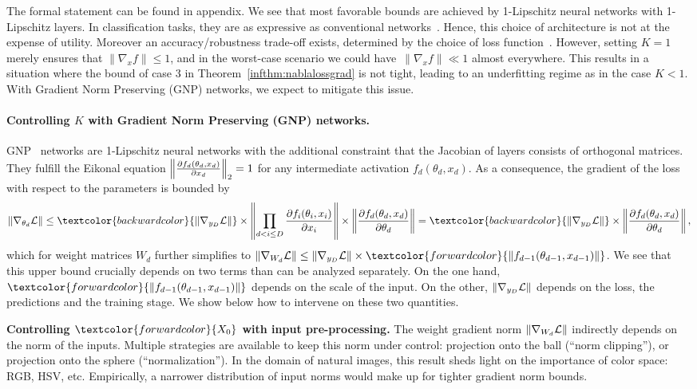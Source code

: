     The formal statement can be found in appendix. We see that most favorable bounds are achieved by 1-Lipschitz neural networks with 1-Lipschitz layers. In classification tasks, they are as expressive as conventional networks~\citep{bethune2022pay}. Hence, this choice of architecture is not at the expense of utility. Moreover an accuracy/robustness trade-off exists, determined by the choice of loss function~\citep{bethune2022pay}. However, setting $K=1$ merely ensures that $\|\nabla_x f\| \leq 1$, and in the worst-case scenario we could have~$\|\nabla_x f\| \ll 1$ almost everywhere. This results in a situation where the bound of case 3 in Theorem~\ref{infthm:nablalossgrad} is not tight, leading to an underfitting regime as in the case $K<1$. With Gradient Norm Preserving (GNP) networks, we expect to mitigate this issue.  
\paragraph{Controlling \textcolor{paramcolor}{$K$} with Gradient Norm Preserving (GNP) networks.}
    GNP~\citep{li2019preventing} networks are 1-Lipschitz neural networks with the additional constraint that the Jacobian of layers consists of orthogonal matrices. They fulfill the Eikonal equation $\left\|\frac{\partial f_d (\theta_d, x_d) }{\partial x_d}\right\|_2=1$ for any intermediate activation $f_d(\theta_d,x_d)$. As a consequence, the gradient of the loss with respect to the parameters is bounded by
    \begin{equation}
        \|\nabla_{\theta_d}\Loss\|\leq\textcolor{backwardcolor}{\|\nabla_{y_D} \Loss\|}\times \left\|\prod_{d< i\leq D}\Jac{f_i (\theta_i, x_i) }{x_i}\right\|\times \left\|\Jac{f_{d}(\theta_{d},x_d)}{\theta_{d}}\right\|=\textcolor{backwardcolor}{\|\nabla_{y_D} \Loss\|}\times \left\|\Jac{f_{d}(\theta_{d},x_d)}{\theta_{d}}\right\|,
    \end{equation}
    which for weight matrices $W_d$ further simplifies to $\|\nabla_{W_d}\Loss\|\leq \|\nabla_{y_D} \Loss\|\times \textcolor{forwardcolor}{\left\|f_{d-1}(\theta_{d-1},x_{d-1})\right\|}$. We see that this upper bound crucially depends on two terms than can be analyzed separately. On the one hand, $\textcolor{forwardcolor}{\left\|f_{d-1}(\theta_{d-1},x_{d-1})\right\|}$ depends on the scale of the input. On the other, $\|\nabla_{y_D} \mathcal{L}\|$ depends on the loss, the predictions and the training stage. We show below how to intervene on these two quantities. 
    
\textbf{Controlling $\textcolor{forwardcolor}{X_0}$ with input pre-processing.}
    The weight gradient norm $\|\nabla_{W_d}\mathcal{L}\|$ indirectly depends on the norm of the inputs. Multiple strategies are available to keep this norm under control: projection onto the ball (``norm clipping''), or projection onto the sphere (``normalization''). In the domain of natural images, this result sheds light on the importance of color space: RGB, HSV, etc. Empirically, a narrower distribution of input norms would make up for tighter gradient norm bounds. %


